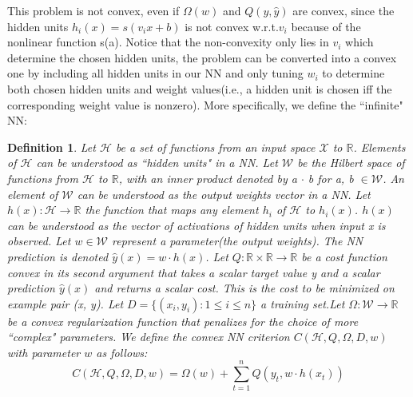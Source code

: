 \documentclass{article}
\begin{document}
This problem is not convex, even if $\Omega(w)$ and $Q(y,\hat{y})$ are convex, since the hidden units $h_{i}(x) = s(v_{i}x+b)$ is not convex w.r.t.$v_{i}$ because of the nonlinear function s(a). Notice that the non-convexity only lies in $v_{i}$ which determine the chosen hidden units, the problem can be converted into a convex one by including all hidden units in our NN and only tuning $w_{i}$ to determine both chosen hidden units and weight values(i.e., a hidden unit is chosen iff the corresponding weight value is nonzero). More specifically, we define the ``infinite" NN:
\newtheorem{defn}{Definition}[section]
\begin{defn}
	Let $\mathcal{H}$ be a set of functions from an input space $\mathcal{X}$ to $\mathbb{R}$. Elements of $\mathcal{H}$ can be understood as ``hidden units" in a NN. Let $\mathcal{W}$ be the Hilbert space of functions from $\mathcal{H}$ to $\mathbb{R}$, with an inner product denoted by a $\cdot$ b for a, b $\in \mathcal{W}$. An element of $\mathcal{W}$ can be understood as the output weights vector in a NN. Let $h(x):\mathcal{H}\rightarrow \mathbb{R}$ the function that maps any element $h_{i}$ of $\mathcal{H}$ to $h_{i}(x)$. $h(x)$ can be understood as the vector of activations of hidden units when input x is observed. Let $w \in \mathcal{W}$ represent a parameter(the output weights). The NN prediction is denoted $\hat{y}(x)= w\cdot h(x)$. Let $Q:\mathbb{R}\times \mathbb{R} \rightarrow \mathbb{R}$ be a cost function convex in its second argument that takes a scalar target value y and a scalar prediction $\hat{y}(x)$ and returns a scalar cost. This is the cost to be minimized on example pair (x, y). Let $D = \{ (x_{i},y_{i}):1\le i \le n\}$ a training set.Let $\Omega : \mathcal{W} \rightarrow \mathbb{R}$ be a convex regularization function that penalizes for the choice of more ``complex" parameters. We define the convex NN criterion $C(\mathcal{H}, Q, \Omega, D, w)$ with parameter $w$ as follows:
	\begin{equation}
	C(\mathcal{H}, Q, \Omega, D, w) = \Omega(w) + \sum_{t=1}^{n}Q(y_{t}, w \cdot h(x_{t}))
	\end{equation}
\end{defn}
\end{document}
